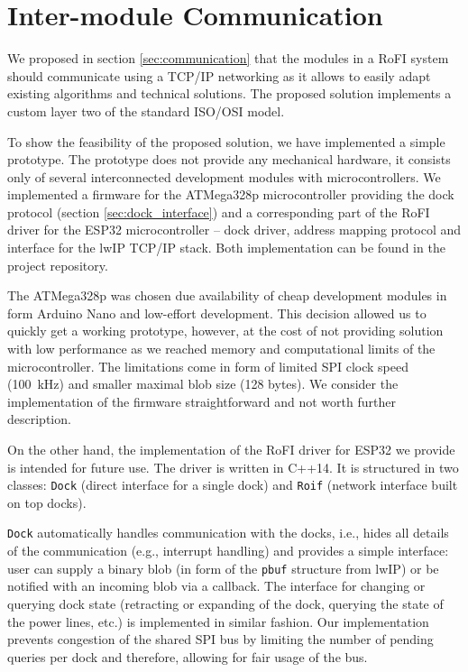 \section{Inter-module Communication}

We proposed in section \ref{sec:communication} that the modules in a RoFI system
should communicate using a TCP/IP networking as it allows to easily adapt
existing algorithms and technical solutions. The proposed solution implements a
custom layer two of the standard ISO/OSI model.

To show the feasibility of the proposed solution, we have implemented a simple
prototype. The prototype does not provide any mechanical hardware, it consists
only of several interconnected development modules with microcontrollers. We
implemented a firmware for the ATMega328p microcontroller providing the dock
protocol (section \ref{sec:dock_interface}) and a corresponding part of the RoFI
driver for the ESP32 microcontroller -- dock driver, address mapping protocol
and interface for the lwIP TCP/IP stack. Both implementation can be found in the
project repository.

The ATMega328p was chosen due availability of cheap development modules in form
Arduino Nano and low-effort development. This decision allowed us to quickly get
a working prototype, however, at the cost of not providing solution with low
performance as we reached memory and computational limits of the
microcontroller. The limitations come in form of limited SPI clock speed
(100~kHz) and smaller maximal blob size (128 bytes). We consider the
implementation of the firmware straightforward and not worth further
description.

On the other hand, the implementation of the RoFI driver for ESP32 we provide is
intended for future use. The driver is written in C++14. It is structured in two
classes: \texttt{Dock} (direct interface for a single dock) and \texttt{Roif}
(network interface built on top docks).

\texttt{Dock} automatically handles communication with the docks, i.e., hides
all details of the communication (e.g., interrupt handling) and provides a
simple interface: user can supply a binary blob (in form of the \texttt{pbuf}
structure from lwIP) or be notified with an incoming blob via a callback. The
interface for changing or querying dock state (retracting or expanding of the
dock, querying the state of the power lines, etc.) is implemented in similar
fashion. Our implementation prevents congestion of the shared SPI bus by
limiting the number of pending queries per dock and therefore, allowing for fair
usage of the bus.

